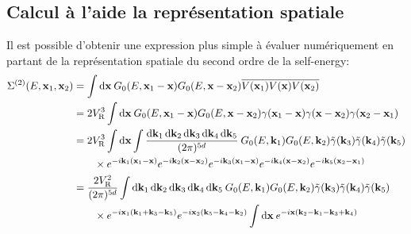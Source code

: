 \subsection{Calcul à l'aide la représentation spatiale}
Il est possible d'obtenir une expression plus simple à évaluer numériquement en partant de la représentation spatiale du second ordre de la self-energy:
\begin{align}
\Sigma^{(2)}(E,\mathbf{x}_{\mathrm{1}},\mathbf{x}_{\mathrm{2}}) &= \int{\diff \mathbf{x} \: G_0(E,\mathbf{x}_{\mathrm{1}} - \mathbf{x}) G_0(E,\mathbf{x}-\mathbf{x}_{\mathrm{2}}) \overline{V(\mathbf{x}_{\mathrm{1}})V(\mathbf{x})V(\mathbf{x}_{\mathrm{2}})}} \\
&=2 \VR^3 \int{\diff\mathbf{x} \: G_0(E,\mathbf{x}_{\mathrm{1}} - \mathbf{x}) G_0(E,\mathbf{x}-\mathbf{x}_{\mathrm{2}}) \gamma(\mathbf{x}_{\mathrm{1}}-\mathbf{x})\gamma(\mathbf{x}-\mathbf{x}_{\mathrm{2}})\gamma(\mathbf{x}_{\mathrm{2}}-\mathbf{x}_{\mathrm{1}})} \\
&=2 \VR^3 \int{\diff\mathbf{x} \int{\frac{\diff\mathbf{k}_{\mathrm{1}}\diff\mathbf{k}_{\mathrm{2}}\diff\mathbf{k}_{\mathrm{3}}\diff\mathbf{k}_{\mathrm{4}}\diff\mathbf{k}_{\mathrm{5}}}{(2\pi)^{5d}}\: G_0(E,\mathbf{k}_{\mathrm{1}}) G_0(E,\mathbf{k}_{\mathrm{2}}) \tilde{\gamma}(\mathbf{k}_{\mathrm{3}})\tilde{\gamma}(\mathbf{k}_{\mathrm{4}})\tilde{\gamma}(\mathbf{k}_{\mathrm{5}}) }} \\
&\nonumber \qquad\times e^{-i\mathbf{k}_{\mathrm{1}}(\mathbf{x}_{\mathrm{1}}-\mathbf{x})} e^{-i\mathbf{k}_{\mathrm{2}}(\mathbf{x}-\mathbf{x}_{\mathrm{2}})} e^{-i\mathbf{k}_{\mathrm{3}}(\mathbf{x}_{\mathrm{1}}-\mathbf{x})} e^{-i\mathbf{k}_{\mathrm{4}}(\mathbf{x}-\mathbf{x}_{\mathrm{2}})} e^{-i\mathbf{k}_{\mathrm{5}}(\mathbf{x}_{\mathrm{2}}-\mathbf{x}_{\mathrm{1}})} \\
&= \frac{2\VR^2}{(2\pi)^{5d}} \int{\diff\mathbf{k}_{\mathrm{1}}\diff\mathbf{k}_{\mathrm{2}}\diff\mathbf{k}_{\mathrm{3}}\diff\mathbf{k}_{\mathrm{4}}\diff\mathbf{k}_{\mathrm{5}}\: G_0(E,\mathbf{k}_{\mathrm{1}}) G_0(E,\mathbf{k}_{\mathrm{2}}) \tilde{\gamma}(\mathbf{k}_{\mathrm{3}})\tilde{\gamma}(\mathbf{k}_{\mathrm{4}})\tilde{\gamma}(\mathbf{k}_{\mathrm{5}})}\\
&\nonumber \qquad \times e^{-i\mathbf{x}_{\mathrm{1}} (\mathbf{k}_{\mathrm{1}}+\mathbf{k}_{\mathrm{3}}-\mathbf{k}_{\mathrm{5}})} e^{-i\mathbf{x}_{\mathrm{2}}(\mathbf{k}_{\mathrm{5}}-\mathbf{k}_{\mathrm{4}}-\mathbf{k}_{\mathrm{2}})} \int{\diff\mathbf{x}\: e^{-i\mathbf{x}(\mathbf{k}_{\mathrm{2}}-\mathbf{k}_{\mathrm{1}}-\mathbf{k}_{\mathrm{3}}+\mathbf{k}_{\mathrm{4}})}}\\

\end{align}
